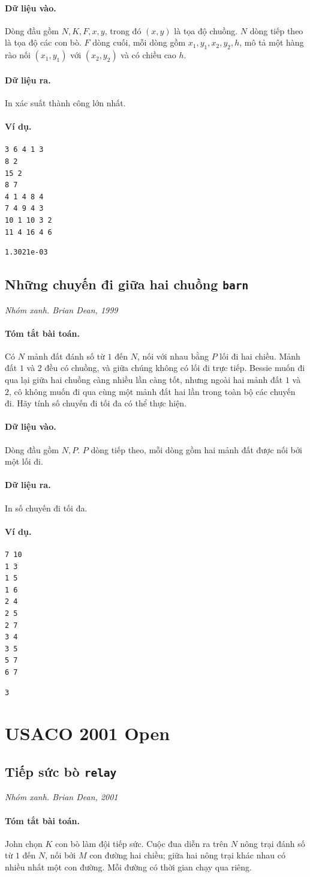 \documentclass[11pt]{article}
\newcommand{\problem}[4]{%
  \subsection[#1 (#2)]{#1 \hfill {\normalsize\texttt{#2}}}%
  \noindent\textit{#3. #4}\par\smallskip
}
\newcommand{\iosec}[1]{\paragraph{#1}}
\begin{document}
\iosec{Dữ liệu vào.}
Dòng đầu gồm \(N,K,F,x,y\), trong đó \((x,y)\) là tọa độ chuồng. \(N\) dòng
tiếp theo là tọa độ các con bò. \(F\) dòng cuối, mỗi dòng gồm
\(x_1,y_1,x_2,y_2,h\), mô tả một hàng rào nối \((x_1,y_1)\) với
\((x_2,y_2)\) và có chiều cao \(h\).

\iosec{Dữ liệu ra.}
In xác suất thành công lớn nhất.

\iosec{Ví dụ.}
\begin{verbatim}
3 6 4 1 3
8 2
15 2
8 7
4 1 4 8 4
7 4 9 4 3
10 1 10 3 2
11 4 16 4 6
\end{verbatim}

\begin{verbatim}
1.3021e-03
\end{verbatim}

\problem{Những chuyến đi giữa hai chuồng}{barn}{Nhóm xanh}{Brian Dean, 1999}

\iosec{Tóm tắt bài toán.}
Có \(N\) mảnh đất đánh số từ \(1\) đến \(N\), nối với nhau bằng \(P\) lối đi
hai chiều. Mảnh đất \(1\) và \(2\) đều có chuồng, và giữa chúng không có lối đi
trực tiếp. Bessie muốn đi qua lại giữa hai chuồng càng nhiều lần càng tốt,
nhưng ngoài hai mảnh đất \(1\) và \(2\), cô không muốn đi qua cùng một mảnh đất
hai lần trong toàn bộ các chuyến đi. Hãy tính số chuyến đi tối đa có thể thực
hiện.

\iosec{Dữ liệu vào.}
Dòng đầu gồm \(N,P\). \(P\) dòng tiếp theo, mỗi dòng gồm hai mảnh đất được nối
bởi một lối đi.

\iosec{Dữ liệu ra.}
In số chuyến đi tối đa.

\iosec{Ví dụ.}
\begin{verbatim}
7 10
1 3
1 5
1 6
2 4
2 5
2 7
3 4
3 5
5 7
6 7
\end{verbatim}

\begin{verbatim}
3
\end{verbatim}

\section{USACO 2001 Open}

\problem{Tiếp sức bò}{relay}{Nhóm xanh}{Brian Dean, 2001}

\iosec{Tóm tắt bài toán.}
John chọn \(K\) con bò làm đội tiếp sức. Cuộc đua diễn ra trên \(N\) nông trại
đánh số từ \(1\) đến \(N\), nối bởi \(M\) con đường hai chiều; giữa hai nông
trại khác nhau có nhiều nhất một con đường. Mỗi đường có thời gian chạy qua
riêng.
\end{document}
